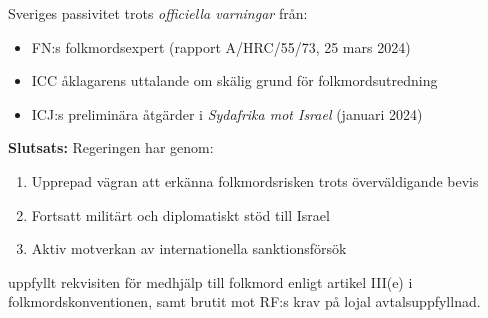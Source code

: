 
Sveriges passivitet trots \textit{officiella varningar} från:
\begin{itemize}
    \item FN:s folkmordsexpert (rapport A/HRC/55/73, 25 mars 2024)
    \item ICC åklagarens uttalande om skälig grund för folkmordsutredning
    \item ICJ:s preliminära åtgärder i \textit{Sydafrika mot Israel} (januari 2024)
\end{itemize}

\vspace{0.5cm}
\textbf{Slutsats:} Regeringen har genom:
\begin{enumerate}
    \item Upprepad vägran att erkänna folkmordsrisken trots överväldigande bevis
    \item Fortsatt militärt och diplomatiskt stöd till Israel
    \item Aktiv motverkan av internationella sanktionsförsök
\end{enumerate}
uppfyllt rekvisiten för medhjälp till folkmord enligt artikel III(e) i folkmordskonventionen, samt brutit mot RF:s krav på lojal avtalsuppfyllnad.